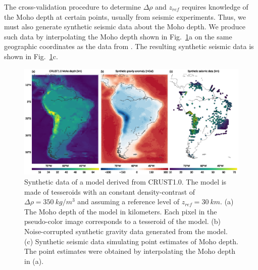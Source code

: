\documentclass[extra]{gji}
\begin{document}
The cross-validation procedure to determine $\Delta\rho$ and $z_{ref}$
requires knowledge of the Moho depth at certain points,
usually from seismic experiments.
Thus, we must also generate synthetic seismic data about the Moho depth.
We produce such data by interpolating the Moho depth shown in
Fig.~\ref{fig:crust1-data}a on the same geographic coordinates as the
data from \citet{assumpcao2012}.
The resulting synthetic seismic data is shown in Fig.~\ref{fig:crust1-data}c.


\begin{figure}
    \centering
    \includegraphics[width=\textwidth]{figures/synthetic-crust1-data}
    \caption{
        Synthetic data of a model derived from CRUST1.0.
        The model is made of tesseroids with an constant density-contrast
        of $\Delta\rho = 350\ kg/m^3$ and assuming a reference level of
        $z_{ref} = 30\ km$.
        (a) The Moho depth of the model in kilometers.
        Each pixel in the pseudo-color image corresponds to a tesseroid of the
        model.
        (b) Noise-corrupted synthetic gravity data generated from the model.
        (c) Synthetic seismic data simulating point estimates of Moho depth.
        The point estimates were obtained by interpolating
        the Moho depth in (a).
    }
    \label{fig:crust1-data}
\end{figure}
\end{document}

